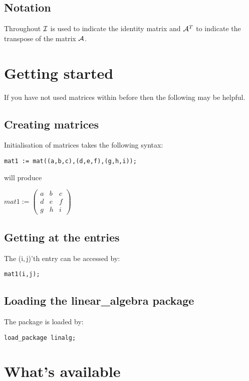 \subsection*{Notation}

Throughout ${\cal I}$ is used to indicate the identity matrix and 
${\cal A}^T$ to indicate the transpose of the matrix ${\cal A}$.

\section{Getting started}

If you have not used matrices within {\REDUCE} before then the 
following may be helpful.

\subsection*{Creating matrices}

Initialisation of matrices takes the following syntax:

{\tt mat1 := mat((a,b,c),(d,e,f),(g,h,i));}

will produce 

\begin{flushleft}
\begin{math}
mat1 := \left( \begin{array}{ccc} a & b & c \\ d & e & f \\ g & h & i
\end{array} \right)
\end{math}
\end{flushleft}

\subsection*{Getting at the entries}

The (i,$\,$j)'th entry can be accessed by:

{\tt mat1(i,j);}

\subsection*{Loading the linear\_algebra package}

The package is loaded by:

{\tt load\_package linalg;}


\section{What's available}

